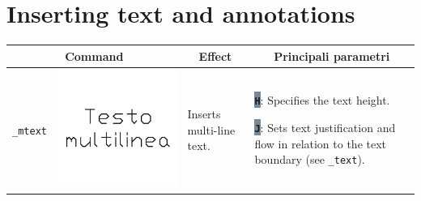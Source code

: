 \documentclass[..]{../IEEEphot}
\newcommand{\param}[1]{\colorbox{LightSlateGray}{\color{Navy}\texttt{\textbf{#1}}}}
\begin{document}
\clearpage

\section{Inserting text and annotations}

\begin{center}
\begin{longtable}{m{.2\linewidth}m{.2\linewidth}m{.25\linewidth}m{.25\linewidth}}
\toprule
    \multicolumn{2}{c}{\bfseries Command} &
    \multicolumn{1}{c}{\bfseries Effect} &
    \multicolumn{1}{c}{\bfseries Principali parametri} \\
\midrule
\texttt{\_mtext} & \includegraphics[width = 0.8\linewidth, keepaspectratio]{../images/jpg/_mtext.jpg} & Inserts multi-line text. & 
\param{H}: Specifies the text height.

\param{J}: Sets text justification and flow in relation to the text boundary (see \texttt{\_text}).


\end{longtable}
\end{center}
\end{document}
